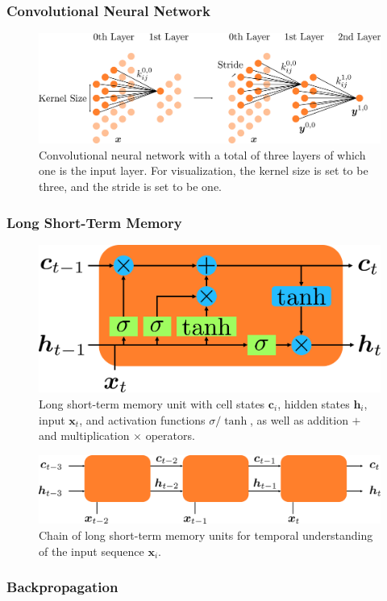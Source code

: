 \subsubsection{Convolutional Neural Network}
\cite{fukushima1980neocognitron} %
\begin{figure}[h]
	\centering
	\includegraphics[scale=.28]{chapters/03_background/img/convolutional.png}
	\caption{Convolutional neural network with a total of three layers of which one is the input layer. For visualization, the kernel size is set to be three, and the stride is set to be one.}
	\label{fig::321_convolutional}
\end{figure}
\subsubsection{Long Short-Term Memory}
\cite{hochreiter1997long} %
\begin{figure}[h]
	\centering
	\includegraphics[scale=.28]{chapters/03_background/img/lstm.png}
	\caption{Long short-term memory unit with cell states $\bm{c}_i$, hidden states $\bm{h}_i$, input $\bm{x}_t$, and activation functions $\sigma/\tanh$, as well as addition $+$ and multiplication $\times$ operators.}
	\label{fig::321_lstm}
\end{figure}
\begin{figure}[h]
	\centering
	\includegraphics[scale=.28]{chapters/03_background/img/lstm_chain.png}
	\caption{Chain of long short-term memory units for temporal understanding of the input sequence $\bm{x}_i$.}
	\label{fig::321_lstm_chain}
\end{figure}
\subsubsection{Backpropagation}
\cite{linnainmaa1970representation}